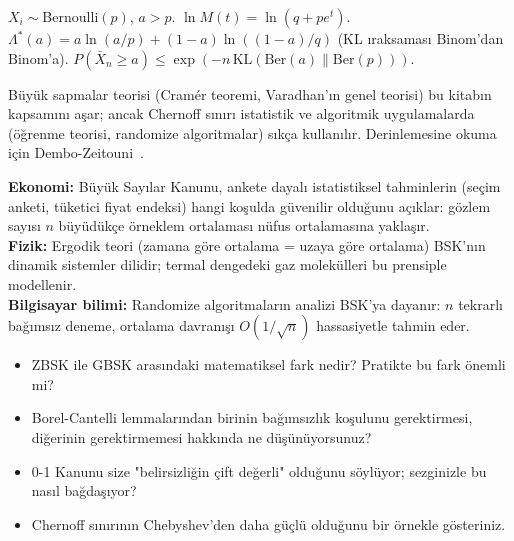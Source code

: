 \begin{ornek}
$X_i \sim \mathrm{Bernoulli}(p)$, $a > p$.
$\ln M(t) = \ln(q + pe^t)$.
$\Lambda^*(a) = a\ln(a/p) + (1-a)\ln((1-a)/q)$ (KL ıraksaması $\mathrm{Binom}$'dan $\mathrm{Binom}$'a).
$P(\bar{X}_n \geq a) \leq \exp(-n\,\mathrm{KL}(\mathrm{Ber}(a)\|\mathrm{Ber}(p)))$.
\end{ornek}

\begin{hocanotu}
Büyük sapmalar teorisi (Cramér teoremi, Varadhan'ın genel teorisi) bu kitabın
kapsamını aşar; ancak Chernoff sınırı istatistik ve algoritmik uygulamalarda
(öğrenme teorisi, randomize algoritmalar) sıkça kullanılır.
Derinlemesine okuma için Dembo-Zeitouni~\cite{Dembo1998}.
\end{hocanotu}

\begin{kopru}
\textbf{Ekonomi:} Büyük Sayılar Kanunu, ankete dayalı istatistiksel tahminlerin
(seçim anketi, tüketici fiyat endeksi) hangi koşulda güvenilir olduğunu açıklar:
gözlem sayısı $n$ büyüdükçe örneklem ortalaması nüfus ortalamasına yaklaşır.\\
\textbf{Fizik:} Ergodik teori (zamana göre ortalama = uzaya göre ortalama)
BSK'nın dinamik sistemler dilidir; termal dengedeki gaz molekülleri bu prensiple modellenir.\\
\textbf{Bilgisayar bilimi:} Randomize algoritmaların analizi BSK'ya dayanır:
$n$ tekrarlı bağımsız deneme, ortalama davranışı $O(1/\sqrt{n})$ hassasiyetle tahmin eder.
\end{kopru}

\begin{ozyansima}
\begin{itemize}
  \item ZBSK ile GBSK arasındaki matematiksel fark nedir? Pratikte bu fark önemli mi?
  \item Borel-Cantelli lemmalarından birinin bağımsızlık koşulunu gerektirmesi,
        diğerinin gerektirmemesi hakkında ne düşünüyorsunuz?
  \item 0-1 Kanunu size "belirsizliğin çift değerli" olduğunu söylüyor;
        sezginizle bu nasıl bağdaşıyor?
  \item Chernoff sınırının Chebyshev'den daha güçlü olduğunu bir örnekle gösteriniz.
\end{itemize}
\end{ozyansima}

